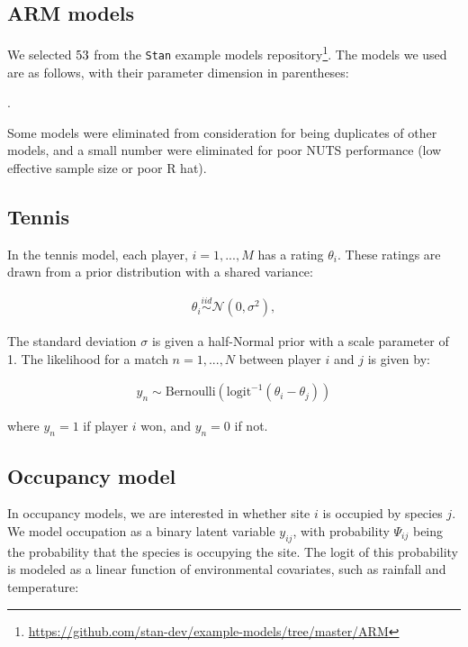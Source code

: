 \subsection{ARM models}

We selected $53$ from the \texttt{Stan} example models
repository\footnote{\url{https://github.com/stan-dev/example-models/tree/master/ARM}}.
The models we used are as follows, with their parameter dimension in parentheses:
%
\newenvironment{simplechar}{%
   \catcode`\_=12
}{}


\texttt{\ArmModels{}}.

Some models were eliminated from consideration for being duplicates of other
models, and a small number were eliminated for poor NUTS performance (low
effective sample size or poor R hat).

\subsection{Tennis}

In the tennis model, each player, $i=1,...,M$ has a rating $\theta_i$. These
ratings are drawn from a prior distribution with a shared variance:

\begin{align}
    \theta_i \stackrel{iid}{\sim} \mathcal{N}(0, \sigma^2),
\end{align}

The standard deviation $\sigma$ is given a half-Normal prior with a scale
parameter of 1. The likelihood for a match $n=1,...,N$ between player $i$ and
$j$ is given by:

\begin{align}
    y_n  \sim \text{Bernoulli}(\text{logit}^{-1}(\theta_i - \theta_j))
\end{align}

where $y_n = 1$ if player $i$ won, and $y_n = 0$ if not.




\subsection{Occupancy model}

In occupancy models, we are interested in whether site $i$ is occupied by
species $j$. We model occupation as a binary latent variable
$y_{ij}$, with probability $\Psi_{ij}$ being the probability that the species is
occupying the site. The logit of this probability is modeled as a linear
function of environmental covariates, such as rainfall and temperature:

